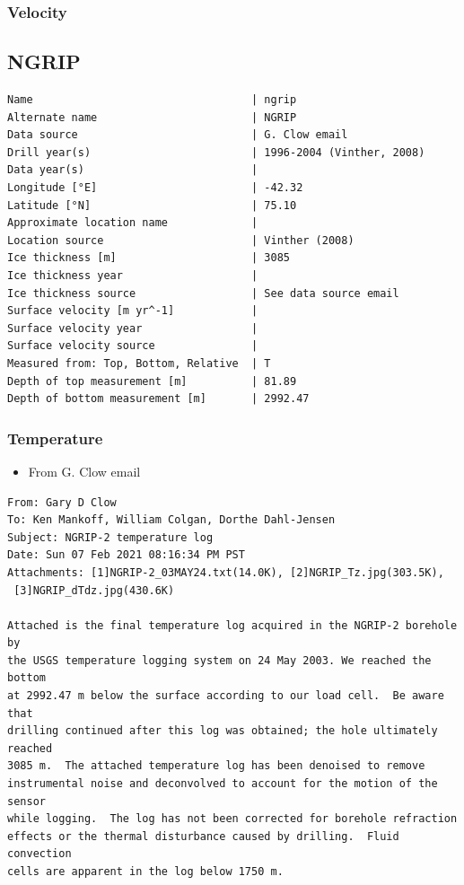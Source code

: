 \documentclass[article,a4paper,times,11pt,twoside]{article}
\begin{document}
\subsubsection{Velocity}
\label{sec:orgc436c91}
\clearpage
\subsection{NGRIP}
\label{sec:org23da171}
\begin{verbatim}
Name                                  | ngrip
Alternate name                        | NGRIP
Data source                           | G. Clow email
Drill year(s)                         | 1996-2004 (Vinther, 2008)
Data year(s)                          | 
Longitude [°E]                        | -42.32
Latitude [°N]                         | 75.10
Approximate location name             | 
Location source                       | Vinther (2008)
Ice thickness [m]                     | 3085
Ice thickness year                    | 
Ice thickness source                  | See data source email
Surface velocity [m yr^-1]            | 
Surface velocity year                 | 
Surface velocity source               | 
Measured from: Top, Bottom, Relative  | T
Depth of top measurement [m]          | 81.89
Depth of bottom measurement [m]       | 2992.47
\end{verbatim}

\subsubsection{Temperature}
\label{sec:org98155b9}

\begin{itemize}
\item From G. Clow email
\end{itemize}

\begin{verbatim}
From: Gary D Clow
To: Ken Mankoff, William Colgan, Dorthe Dahl-Jensen
Subject: NGRIP-2 temperature log
Date: Sun 07 Feb 2021 08:16:34 PM PST
Attachments: [1]NGRIP-2_03MAY24.txt(14.0K), [2]NGRIP_Tz.jpg(303.5K),
 [3]NGRIP_dTdz.jpg(430.6K)

Attached is the final temperature log acquired in the NGRIP-2 borehole by
the USGS temperature logging system on 24 May 2003. We reached the bottom
at 2992.47 m below the surface according to our load cell.  Be aware that
drilling continued after this log was obtained; the hole ultimately reached
3085 m.  The attached temperature log has been denoised to remove
instrumental noise and deconvolved to account for the motion of the sensor
while logging.  The log has not been corrected for borehole refraction
effects or the thermal disturbance caused by drilling.  Fluid convection
cells are apparent in the log below 1750 m.
\end{verbatim}
\end{document}

